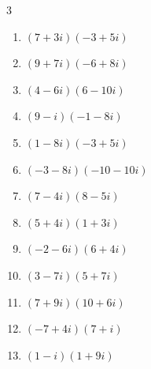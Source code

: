 \begin{multicols}{3}
\begin{enumerate}
  \item $\displaystyle (7+3i)(-3+5i)$

        \phantom{$\displaystyle =-36+26i$}

  \item $\displaystyle (9+7i)(-6+8i)$

        \phantom{$\displaystyle =-110+30i$}

  \item $\displaystyle (4-6i)(6-10i)$

        \phantom{$\displaystyle =-36-76i$}

  \item $\displaystyle (9-i)(-1-8i)$

        \phantom{$\displaystyle =-17-71i$}

  \item $\displaystyle (1-8i)(-3+5i)$

        \phantom{$\displaystyle =37+29i$}

  \item $\displaystyle (-3-8i)(-10-10i)$

        \phantom{$\displaystyle =-50+110i$}

  \item $\displaystyle (7-4i)(8-5i)$

        \phantom{$\displaystyle =36-67i$}

  \item $\displaystyle (5+4i)(1+3i)$

        \phantom{$\displaystyle =-7+19i$}

  \item $\displaystyle (-2-6i)(6+4i)$

        \phantom{$\displaystyle =12-44i$}

  \item $\displaystyle (3-7i)(5+7i)$

        \phantom{$\displaystyle =64-14i$}

  \item $\displaystyle (7+9i)(10+6i)$

        \phantom{$\displaystyle =16+132i$}

\columnbreak %

  \item $\displaystyle (-7+4i)(7+i)$

        \phantom{$\displaystyle =-53+21i$}

  \item $\displaystyle (1-i)(1+9i)$


\end{enumerate}
\end{multicols}
